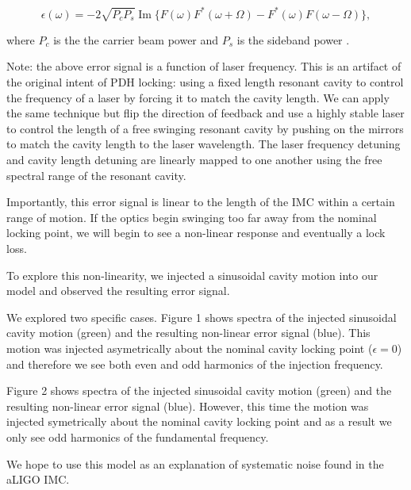 \begin{equation}
\epsilon(\omega) = -2\sqrt{P_{c}P_{s}}\operatorname{Im}\{F(\omega)F^*(\omega + \Omega) - F^*(\omega)F(\omega - \Omega)\},
\end{equation}

where $P_{c}$ is the the carrier beam power and $P_{s}$ is the sideband power \cite{Black01}.

Note: the above error signal is a function of laser frequency. This is an artifact of the original intent of PDH locking: using a fixed length resonant cavity to control the frequency of a laser by forcing it to match the cavity length. We can apply the same technique but flip the direction of feedback and use a highly stable laser to control the length of a free swinging resonant cavity by pushing on the mirrors to match the cavity length to the laser wavelength. The laser frequency detuning and cavity length detuning are linearly mapped to one another using the free spectral range of the resonant cavity.

Importantly, this error signal is linear to the length of the IMC within a certain range of motion. If the optics begin swinging too far away from the nominal locking point, we will begin to see a non-linear response and eventually a lock loss.

To explore this non-linearity, we injected a sinusoidal cavity motion into our model and observed the resulting error signal.

We explored two specific cases. Figure 1 shows spectra of the injected sinusoidal cavity motion (green) and the resulting non-linear error signal (blue). This motion was injected asymetrically about the nominal cavity locking point ($\epsilon = 0$) and therefore we see both even and odd harmonics of the injection frequency.

Figure 2 shows spectra of the injected sinusoidal cavity motion (green) and the resulting non-linear error signal (blue). However, this time the motion was injected symetrically about the nominal cavity locking point and as a result we only see odd harmonics of the fundamental frequency.

We hope to use this model as an explanation of systematic noise found in the aLIGO IMC.

